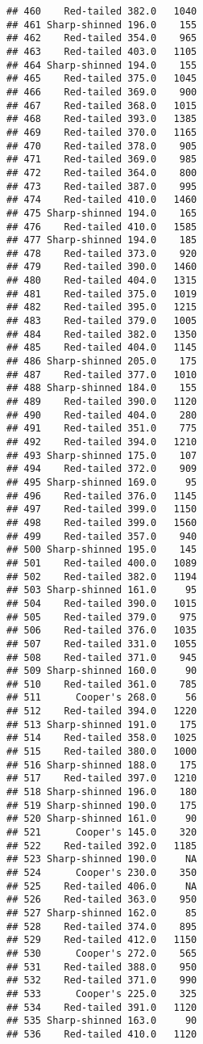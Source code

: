 \documentclass[
]{article}
\begin{document}
\begin{verbatim}
## 460    Red-tailed 382.0   1040
## 461 Sharp-shinned 196.0    155
## 462    Red-tailed 354.0    965
## 463    Red-tailed 403.0   1105
## 464 Sharp-shinned 194.0    155
## 465    Red-tailed 375.0   1045
## 466    Red-tailed 369.0    900
## 467    Red-tailed 368.0   1015
## 468    Red-tailed 393.0   1385
## 469    Red-tailed 370.0   1165
## 470    Red-tailed 378.0    905
## 471    Red-tailed 369.0    985
## 472    Red-tailed 364.0    800
## 473    Red-tailed 387.0    995
## 474    Red-tailed 410.0   1460
## 475 Sharp-shinned 194.0    165
## 476    Red-tailed 410.0   1585
## 477 Sharp-shinned 194.0    185
## 478    Red-tailed 373.0    920
## 479    Red-tailed 390.0   1460
## 480    Red-tailed 404.0   1315
## 481    Red-tailed 375.0   1019
## 482    Red-tailed 395.0   1215
## 483    Red-tailed 379.0   1005
## 484    Red-tailed 382.0   1350
## 485    Red-tailed 404.0   1145
## 486 Sharp-shinned 205.0    175
## 487    Red-tailed 377.0   1010
## 488 Sharp-shinned 184.0    155
## 489    Red-tailed 390.0   1120
## 490    Red-tailed 404.0    280
## 491    Red-tailed 351.0    775
## 492    Red-tailed 394.0   1210
## 493 Sharp-shinned 175.0    107
## 494    Red-tailed 372.0    909
## 495 Sharp-shinned 169.0     95
## 496    Red-tailed 376.0   1145
## 497    Red-tailed 399.0   1150
## 498    Red-tailed 399.0   1560
## 499    Red-tailed 357.0    940
## 500 Sharp-shinned 195.0    145
## 501    Red-tailed 400.0   1089
## 502    Red-tailed 382.0   1194
## 503 Sharp-shinned 161.0     95
## 504    Red-tailed 390.0   1015
## 505    Red-tailed 379.0    975
## 506    Red-tailed 376.0   1035
## 507    Red-tailed 331.0   1055
## 508    Red-tailed 371.0    945
## 509 Sharp-shinned 160.0     90
## 510    Red-tailed 361.0    785
## 511      Cooper's 268.0     56
## 512    Red-tailed 394.0   1220
## 513 Sharp-shinned 191.0    175
## 514    Red-tailed 358.0   1025
## 515    Red-tailed 380.0   1000
## 516 Sharp-shinned 188.0    175
## 517    Red-tailed 397.0   1210
## 518 Sharp-shinned 196.0    180
## 519 Sharp-shinned 190.0    175
## 520 Sharp-shinned 161.0     90
## 521      Cooper's 145.0    320
## 522    Red-tailed 392.0   1185
## 523 Sharp-shinned 190.0     NA
## 524      Cooper's 230.0    350
## 525    Red-tailed 406.0     NA
## 526    Red-tailed 363.0    950
## 527 Sharp-shinned 162.0     85
## 528    Red-tailed 374.0    895
## 529    Red-tailed 412.0   1150
## 530      Cooper's 272.0    565
## 531    Red-tailed 388.0    950
## 532    Red-tailed 371.0    990
## 533      Cooper's 225.0    325
## 534    Red-tailed 391.0   1120
## 535 Sharp-shinned 163.0     90
## 536    Red-tailed 410.0   1120

\end{verbatim}
\end{document}
